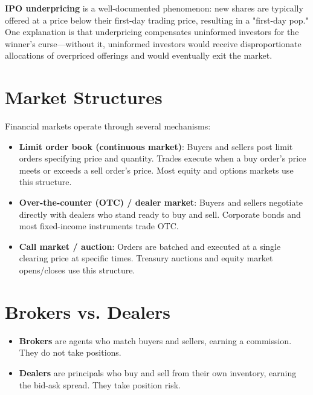 \documentclass[11pt,letterpaper]{report}
\begin{document}
\textbf{IPO underpricing} is a well-documented phenomenon: new shares are typically offered at a price below their first-day trading price, resulting in a "first-day pop."  One explanation is that underpricing compensates uninformed investors for the winner's curse---without it, uninformed investors would receive disproportionate allocations of overpriced offerings and would eventually exit the market.

\section{Market Structures}


Financial markets operate through several mechanisms:

\begin{itemize}
  \item \textbf{Limit order book (continuous market)}: Buyers and sellers post limit orders specifying price and quantity.  Trades execute when a buy order's price meets or exceeds a sell order's price.  Most equity and options markets use this structure.
\end{itemize}

\begin{itemize}
  \item \textbf{Over-the-counter (OTC) / dealer market}: Buyers and sellers negotiate directly with dealers who stand ready to buy and sell.  Corporate bonds and most fixed-income instruments trade OTC.
\end{itemize}

\begin{itemize}
  \item \textbf{Call market / auction}: Orders are batched and executed at a single clearing price at specific times.  Treasury auctions and equity market opens/closes use this structure.
\end{itemize}

\section{Brokers vs. Dealers}


\begin{itemize}
  \item \textbf{Brokers} are agents who match buyers and sellers, earning a commission.  They do not take positions.
  \item \textbf{Dealers} are principals who buy and sell from their own inventory, earning the bid-ask spread.  They take position risk.
\end{itemize}
\end{document}
